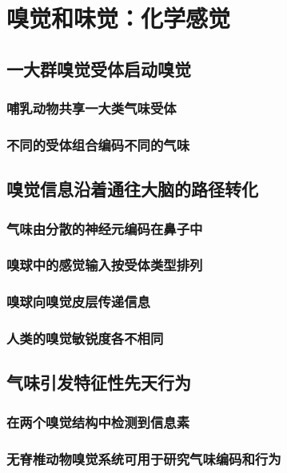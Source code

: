 \chapter{嗅觉和味觉：化学感觉}

\section{一大群嗅觉受体启动嗅觉}
\subsection{哺乳动物共享一大类气味受体}
\subsection{不同的受体组合编码不同的气味}

\section{嗅觉信息沿着通往大脑的路径转化}
\subsection{气味由分散的神经元编码在鼻子中}
\subsection{嗅球中的感觉输入按受体类型排列}
\subsection{嗅球向嗅觉皮层传递信息}
\subsection{人类的嗅觉敏锐度各不相同}

\section{气味引发特征性先天行为}
\subsection{在两个嗅觉结构中检测到信息素}
\subsection{无脊椎动物嗅觉系统可用于研究气味编码和行为}

